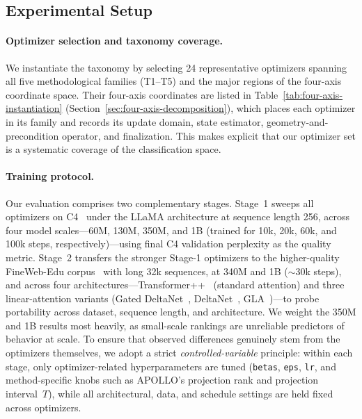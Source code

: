 \subsection{Experimental Setup}
\label{sec:benchmark-setup}

\paragraph{Optimizer selection and taxonomy coverage.}
We instantiate the taxonomy by selecting 24 representative optimizers spanning
all five methodological families (T1--T5) and the major regions of the
four-axis coordinate space. Their four-axis coordinates are listed in
Table~\ref{tab:four-axis-instantiation} (Section~\ref{sec:four-axis-decomposition}),
which places each optimizer in its family and records its update domain, state
estimator, geometry-and-precondition operator, and finalization. This makes
explicit that our optimizer set is a systematic coverage of the classification
space.


\paragraph{Training protocol.}
Our evaluation comprises two complementary stages.
Stage~1 sweeps all optimizers on C4~\cite{raffel2020exploring} under the
LLaMA architecture at sequence length 256, across four model scales---60M,
130M, 350M, and 1B (trained for 10k, 20k, 60k, and 100k steps,
respectively)---using final C4 validation perplexity as the quality metric.
Stage~2 transfers the stronger Stage-1
optimizers to the higher-quality FineWeb-Edu
corpus~\cite{penedo2024finewebdatasetsdecantingweb,karpathy2024finewebedu100b}
with long 32k sequences,
at 340M and 1B ($\sim$30k steps), and across four
architectures---Transformer++~\cite{yang2023gated}
(standard attention) and three linear-attention variants (Gated
DeltaNet~\cite{yang2025gated},
DeltaNet~\cite{yang2024parallelizing}, GLA~\cite{yang2023gated})---to probe portability across dataset, sequence length, and
architecture. We weight the 350M and 1B results most heavily, as small-scale
rankings are unreliable predictors of behavior at scale. To ensure that
observed differences genuinely stem from the optimizers themselves, we adopt a
strict \emph{controlled-variable} principle: within each
stage, only optimizer-related hyperparameters are tuned (\texttt{betas},
\texttt{eps}, \texttt{lr}, and method-specific knobs such as APOLLO's projection
rank and projection interval~$T$), while all architectural, data, and schedule
settings are held fixed across optimizers.
 
